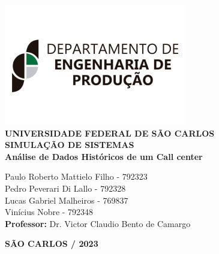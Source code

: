 \justifying %
\onehalfspacing %
\setlength{\parindent}{0cm}  %
\renewcommand*\familydefault{\rmdefault}
\thispagestyle{empty}
\begin{center}
\includegraphics[scale=0.6]{capa/logo-dep.jpg}\\
\vspace*{.8cm}
{\huge \textbf{UNIVERSIDADE FEDERAL DE SÃO CARLOS}}\\
\vspace*{.8cm}
{\Large \textbf{SIMULAÇÃO DE SISTEMAS}}\\
\vspace*{3cm}
{\Large \textbf{Análise de Dados Históricos de um Call center}}\\
\vspace*{4.5cm}
\begin{flushright}
    \onehalfspacing
    {\Large  Paulo Roberto Mattielo Filho - 792323}\\
    {\Large  Pedro Peverari Di Lallo - 792328}\\
    {\Large  Lucas Gabriel Malheiros - 769837}\\
    {\Large  Vinícius Nobre - 792348}\\
    \vspace*{.3cm}
    {\Large \textbf{Professor:}}
    {\Large Dr. Victor Claudio Bento de Camargo}\\
\end{flushright}
\vspace*{\fill}
{\large \bf SÃO CARLOS / 2023}
\end{center}

